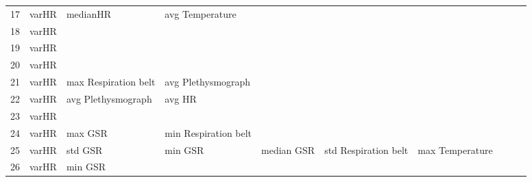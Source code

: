 \begin{landscape}
\begin{table}[]
\begin{tabular}{l|llllllll}
17       & varHR                   & medianHR              & avg Temperature         &                         &                         &                       &                      &          &                      &        \\
18       & varHR                   &                       &                         &                         &                         &                       &                      &          &                      &        \\
19       & varHR                   &                       &                         &                         &                         &                       &                      &          &                      &        \\
20       & varHR                   &                       &                         &                         &                         &                       &                      &          &                      &        \\
21       & varHR                   & max Respiration belt  & avg Plethysmograph      &                         &                         &                       &                      &          &                      &        \\
22       & varHR                   & avg Plethysmograph    & avg HR                  &                         &                         &                       &                      &          &                      &        \\
23       & varHR                   &                       &                         &                         &                         &                       &                      &          &                      &        \\
24       & varHR                   & max GSR               & min Respiration belt    &                         &                         &                       &                      &          &                      &        \\
25       & varHR                   & std GSR               & min GSR                 & median GSR              & std Respiration belt    & max Temperature       &                      &          &                      &        \\
26       & varHR                   & min GSR               &                         &                         &                         &                       &                      &          &                      &        \\

\end{tabular}
\end{table}
\end{landscape}
